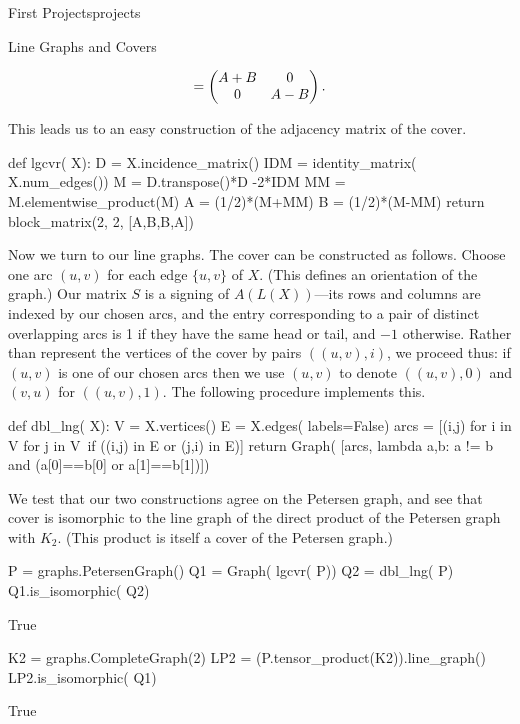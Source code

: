 \begin{chap}{First Projects}{projects}
\begin{sect}{Line Graphs and Covers}
\begin{para}
\[        =\begin{pmatrix} A+B&0\\0&A-B \end{pmatrix}.
\]
\end{para}
%
\begin{para}
This leads us to an easy construction of the adjacency matrix of the cover.
\end{para}
%
\begin{sagecode}
\begin{sageinput}
def lgcvr( X):
    D = X.incidence_matrix()
    IDM = identity_matrix( X.num_edges())
    M = D.transpose()*D -2*IDM
    MM = M.elementwise_product(M)
    A = (1/2)*(M+MM)
    B = (1/2)*(M-MM)
    return block_matrix(2, 2, [A,B,B,A])
\end{sageinput}
\end{sagecode}
%
\begin{para}
Now we turn to our line graphs. The cover can be constructed as follows.
Choose one arc $(u,v)$ for each edge $\{u,v\}$ of $X$. (This defines an orientation
of the graph.) Our matrix $S$ is a signing of $A(L(X))$---its rows and columns
are indexed by our chosen arcs, and the entry corresponding to a pair
of distinct overlapping arcs is 1 if they have the same head or tail,
and $-1$ otherwise. Rather than represent the vertices of the cover by
pairs $((u,v),i)$, we proceed thus: if $(u,v)$ is one of our chosen
arcs then we use $(u,v)$ to denote $((u,v),0)$ and $(v,u)$ for $((u,v),1)$.
The following procedure implements this.
\end{para}
%
\begin{sagecode}
\begin{sageinput}
def dbl_lng( X):
    V = X.vertices()
    E = X.edges( labels=False)
    arcs = [(i,j) for i in V for j in V\
        if ((i,j) in E or (j,i) in E)]
    return  Graph( [arcs, lambda a,b: a != b and (a[0]==b[0] or a[1]==b[1])])
\end{sageinput}
\end{sagecode}
%
\begin{para}
We test that our two constructions agree on the Petersen graph, and see
that cover is isomorphic to the line graph of the direct product of
the Petersen graph with $K_2$. (This product is itself a cover of the Petersen
graph.)
\end{para}
%
\begin{sagecode}
\begin{sageinput}
P = graphs.PetersenGraph()
Q1 = Graph( lgcvr( P))
Q2 = dbl_lng( P)
Q1.is_isomorphic( Q2)
\end{sageinput}
\begin{sageoutput}
True
\end{sageoutput}
\end{sagecode}
%
\begin{sagecode}
\begin{sageinput}
K2 = graphs.CompleteGraph(2)
LP2 = (P.tensor_product(K2)).line_graph()
LP2.is_isomorphic( Q1)
\end{sageinput}
\begin{sageoutput}
True
\end{sageoutput}
\end{sagecode}
%
\end{sect}
%
\end{chap}